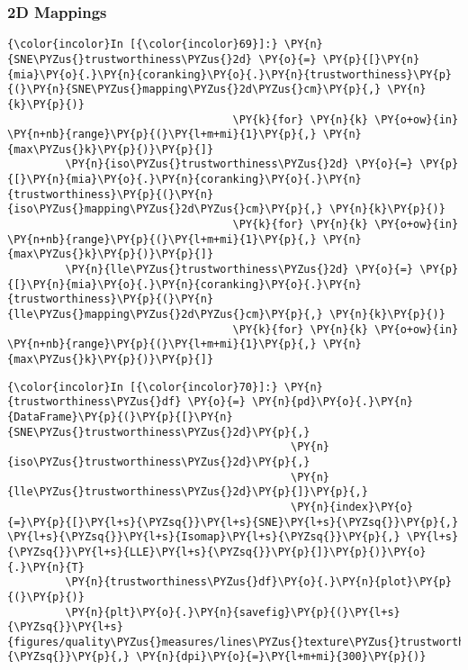     \subsubsection{2D Mappings}\label{d-mappings}

    \begin{Verbatim}[commandchars=\\\{\}]
{\color{incolor}In [{\color{incolor}69}]:} \PY{n}{SNE\PYZus{}trustworthiness\PYZus{}2d} \PY{o}{=} \PY{p}{[}\PY{n}{mia}\PY{o}{.}\PY{n}{coranking}\PY{o}{.}\PY{n}{trustworthiness}\PY{p}{(}\PY{n}{SNE\PYZus{}mapping\PYZus{}2d\PYZus{}cm}\PY{p}{,} \PY{n}{k}\PY{p}{)}
                                   \PY{k}{for} \PY{n}{k} \PY{o+ow}{in} \PY{n+nb}{range}\PY{p}{(}\PY{l+m+mi}{1}\PY{p}{,} \PY{n}{max\PYZus{}k}\PY{p}{)}\PY{p}{]}
         \PY{n}{iso\PYZus{}trustworthiness\PYZus{}2d} \PY{o}{=} \PY{p}{[}\PY{n}{mia}\PY{o}{.}\PY{n}{coranking}\PY{o}{.}\PY{n}{trustworthiness}\PY{p}{(}\PY{n}{iso\PYZus{}mapping\PYZus{}2d\PYZus{}cm}\PY{p}{,} \PY{n}{k}\PY{p}{)}
                                   \PY{k}{for} \PY{n}{k} \PY{o+ow}{in} \PY{n+nb}{range}\PY{p}{(}\PY{l+m+mi}{1}\PY{p}{,} \PY{n}{max\PYZus{}k}\PY{p}{)}\PY{p}{]}
         \PY{n}{lle\PYZus{}trustworthiness\PYZus{}2d} \PY{o}{=} \PY{p}{[}\PY{n}{mia}\PY{o}{.}\PY{n}{coranking}\PY{o}{.}\PY{n}{trustworthiness}\PY{p}{(}\PY{n}{lle\PYZus{}mapping\PYZus{}2d\PYZus{}cm}\PY{p}{,} \PY{n}{k}\PY{p}{)}
                                   \PY{k}{for} \PY{n}{k} \PY{o+ow}{in} \PY{n+nb}{range}\PY{p}{(}\PY{l+m+mi}{1}\PY{p}{,} \PY{n}{max\PYZus{}k}\PY{p}{)}\PY{p}{]}
\end{Verbatim}

    \begin{Verbatim}[commandchars=\\\{\}]
{\color{incolor}In [{\color{incolor}70}]:} \PY{n}{trustworthiness\PYZus{}df} \PY{o}{=} \PY{n}{pd}\PY{o}{.}\PY{n}{DataFrame}\PY{p}{(}\PY{p}{[}\PY{n}{SNE\PYZus{}trustworthiness\PYZus{}2d}\PY{p}{,}
                                            \PY{n}{iso\PYZus{}trustworthiness\PYZus{}2d}\PY{p}{,}
                                            \PY{n}{lle\PYZus{}trustworthiness\PYZus{}2d}\PY{p}{]}\PY{p}{,}
                                            \PY{n}{index}\PY{o}{=}\PY{p}{[}\PY{l+s}{\PYZsq{}}\PY{l+s}{SNE}\PY{l+s}{\PYZsq{}}\PY{p}{,} \PY{l+s}{\PYZsq{}}\PY{l+s}{Isomap}\PY{l+s}{\PYZsq{}}\PY{p}{,} \PY{l+s}{\PYZsq{}}\PY{l+s}{LLE}\PY{l+s}{\PYZsq{}}\PY{p}{]}\PY{p}{)}\PY{o}{.}\PY{n}{T}
         \PY{n}{trustworthiness\PYZus{}df}\PY{o}{.}\PY{n}{plot}\PY{p}{(}\PY{p}{)}
         \PY{n}{plt}\PY{o}{.}\PY{n}{savefig}\PY{p}{(}\PY{l+s}{\PYZsq{}}\PY{l+s}{figures/quality\PYZus{}measures/lines\PYZus{}texture\PYZus{}trustworthiness\PYZus{}2d.png}\PY{l+s}{\PYZsq{}}\PY{p}{,} \PY{n}{dpi}\PY{o}{=}\PY{l+m+mi}{300}\PY{p}{)}
\end{Verbatim}

